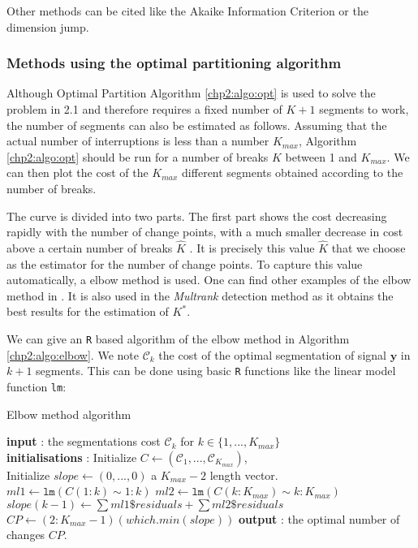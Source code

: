 Other methods can be cited like the Akaike Information Criterion or the dimension jump.  

\subsubsection{Methods using the optimal partitioning algorithm}

Although Optimal Partition Algorithm \ref{chp2:algo:opt} is used to solve the problem in 2.1 and therefore requires a fixed number of $K+1$ segments to work, the number of segments can also be estimated as follows. Assuming that the actual number of interruptions is less than a number $K_{max}$, Algorithm \ref{chp2:algo:opt} should be run for a number of breaks $K$ between 1 and $K_{max}$. We can then plot the cost of the $K_{max}$ different segments obtained according to the number of breaks. 

The curve is divided into two parts. The first part shows the cost decreasing rapidly with the number of change points, with a much smaller decrease in cost above a certain number of breaks $\hat{K}$ \cite{LAVIELLE20051501}. It is precisely this value $\hat{K}$ that we choose as the estimator for the number of change points. To capture this value automatically, a elbow method is used. One can find other examples of the elbow method in \cite{liu2020determine,syakur2018integration}. It is also used in the \textit{Multrank} detection method \cite{lung2015} as it obtains the best results for the estimation of $K^*$.

We can give an \texttt{R} based algorithm of the elbow method in Algorithm \ref{chp2:algo:elbow}. We note $\mathcal{C}_k$ the cost of the optimal segmentation of signal $\bm y$ in $k+1$ segments. This can be done using basic \texttt{R} functions like the linear model function \texttt{lm}:   

\begin{algorithm}[ht]
\caption{Elbow method algorithm}\label{chp2:algo:elbow}
\begin{algorithmic}

\State \textbf{input} : the segmentations cost $\mathcal{C}_k$ for $k \in \{1,...,K_{max}\}$ \\

\State \textbf{initialisations} : Initialize $C \gets (\mathcal{C}_1,...,\mathcal{C}_{K_{max}})$, \\
Initialize $slope \gets (0,...,0)$  a $K_{max}-2$ length vector. 
  \State $ml1 \gets \texttt{lm}(C(1:k) \sim 1:k)$
  \State $ml2 \gets \texttt{lm}(C(k:K_{max}) \sim k:K_{max})$
  \State $slope(k-1) \gets \sum ml1\$ residuals + \sum ml2\$ residuals$
\EndFor
\State $CP \gets (2:K_{max}-1)(which.min(slope))$
\State \textbf{output} : the optimal number of changes $CP$. 
 
\end{algorithmic}
\end{algorithm} 

